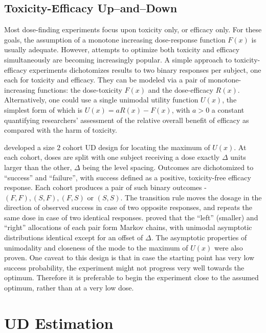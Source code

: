\subsection{Toxicity-Efficacy Up--and--Down}

Most dose-finding experiments focus upon toxicity only, or efficacy only. For these goals, the assumption of a monotone increasing dose-response function $F(x)$ is usually adequate. However, attempts to optimize both toxicity and efficacy simultaneously are becoming increasingly popular. A simple approach to toxicity-efficacy experiments dichotomizes results to two binary responses per subject, one each for toxicity and efficacy. They can be modeled via a pair of monotone-increasing functions: the dose-toxicity $F(x)$ and the dose-efficacy $R(x)$. Alternatively, one could use a single unimodal utility function $U(x)$, the simplest form of which is $U(x)=aR(x)-F(x)$, with $a>0$ a constant quantifying researchers' assessment of the relative overall benefit of efficacy as compared with the harm of toxicity.

\cite{Kpam:Flou:opti:2001} developed a size $2$ cohort UD design for locating the maximum of $U(x)$. At each cohort, doses are split with one subject receiving a dose  exactly $\Delta$ units larger than the other, $\Delta$ being the level spacing. Outcomes are dichotomized to ``success'' and ``failure'', with success defined as a positive, toxicity-free efficacy response. Each cohort produces a pair of such binary outcomes - $(F,F),(S,F),(F,S)$ or $(S,S)$. The transition rule moves the dosage in the direction of observed success in case of two opposite responses, and repeats the same dose in case of two identical responses. \cite{Kpam:Flou:opti:2008} proved that the ``left'' (smaller) and ``right'' allocations of each pair form Markov chains, with unimodal asymptotic distributions identical except for an offset of $\Delta$. The asymptotic properties of unimodality and closeness of the mode to the maximum of $U(x)$ were also proven. One caveat to this design is that in case the starting point has very low success probability, the experiment might not progress very well towards the optimum. Therefore it is preferable to begin the experiment close to the assumed optimum, rather than at a very low dose.


\section{UD Estimation}\label{sec:est}

